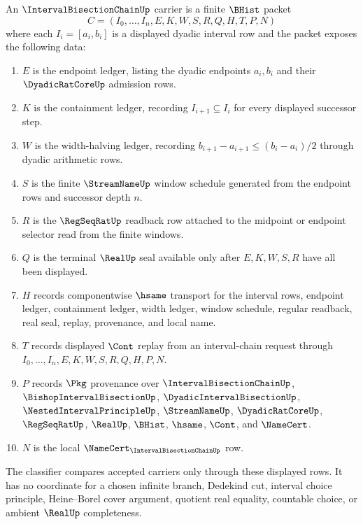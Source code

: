 \begin{definition}
\label{def:interval-bisection-chain-carrier}
An $\IntervalBisectionChainUp$ carrier is a finite $\BHist$ packet
$$
C=(I_0,\ldots,I_n,E,K,W,S,R,Q,H,T,P,N)
$$
where each $I_i=[a_i,b_i]$ is a displayed dyadic interval row and the packet exposes the following data:
\begin{enumerate}
\item $E$ is the endpoint ledger, listing the dyadic endpoints $a_i,b_i$ and their $\DyadicRatCoreUp$ admission rows.
\item $K$ is the containment ledger, recording $I_{i+1}\subseteq I_i$ for every displayed successor step.
\item $W$ is the width-halving ledger, recording $b_{i+1}-a_{i+1}\leq (b_i-a_i)/2$ through dyadic arithmetic rows.
\item $S$ is the finite $\StreamNameUp$ window schedule generated from the endpoint rows and successor depth $n$.
\item $R$ is the $\RegSeqRatUp$ readback row attached to the midpoint or endpoint selector read from the finite windows.
\item $Q$ is the terminal $\RealUp$ seal available only after $E,K,W,S,R$ have all been displayed.
\item $H$ records componentwise $\hsame$ transport for the interval rows, endpoint ledger, containment ledger, width ledger, window schedule, regular readback, real seal, replay, provenance, and local name.
\item $T$ records displayed $\Cont$ replay from an interval-chain request through $I_0,\ldots,I_n,E,K,W,S,R,Q,H,P,N$.
\item $P$ records $\Pkg$ provenance over $\IntervalBisectionChainUp$, $\BishopIntervalBisectionUp$, $\DyadicIntervalBisectionUp$, $\NestedIntervalPrincipleUp$, $\StreamNameUp$, $\DyadicRatCoreUp$, $\RegSeqRatUp$, $\RealUp$, $\BHist$, $\hsame$, $\Cont$, and $\NameCert$.
\item $N$ is the local $\NameCert_{\IntervalBisectionChainUp}$ row.
\end{enumerate}
The classifier compares accepted carriers only through these displayed rows. It has no coordinate for a chosen infinite branch, Dedekind cut, interval choice principle, Heine--Borel cover argument, quotient real equality, countable choice, or ambient $\RealUp$ completeness.
\end{definition}

